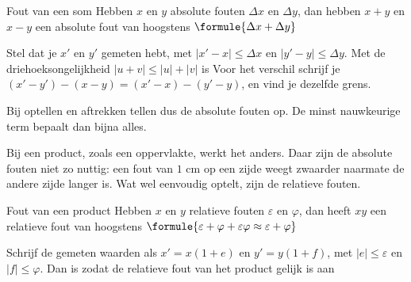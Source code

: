 \begin{theorie}
\begin{stelling}{Fout van een som}
Hebben $x$ en $y$ absolute fouten $\Delta x$ en $\Delta y$, dan hebben $x + y$ en $x - y$ een absolute fout van hoogstens \qquad $\formule{\Delta x + \Delta y}$
\end{stelling}

\begin{bewijs}
Stel dat je $x'$ en $y'$ gemeten hebt, met $|x' - x| \leqslant \Delta x$ en $|y' - y| \leqslant \Delta y$. Met de driehoeksongelijkheid $|u + v| \leqslant |u| + |v|$ is
Voor het verschil schrijf je $(x' - y') - (x - y) = (x' - x) - (y' - y)$, en vind je dezelfde grens.
\end{bewijs}
\end{theorie}

Bij optellen en aftrekken tellen dus de absolute fouten op. De minst nauwkeurige term bepaalt dan bijna alles.


Bij een product, zoals een oppervlakte, werkt het anders. Daar zijn de absolute fouten niet zo nuttig: een fout van $1$ cm op een zijde weegt zwaarder naarmate de andere zijde langer is. Wat wel eenvoudig optelt, zijn de relatieve fouten.

\begin{theorie}
\begin{stelling}{Fout van een product}
Hebben $x$ en $y$ relatieve fouten $\varepsilon$ en $\varphi$, dan heeft $xy$ een relatieve fout van hoogstens \qquad $\formule{\varepsilon + \varphi + \varepsilon\varphi \approx \varepsilon + \varphi}$
\end{stelling}

\begin{bewijs}
Schrijf de gemeten waarden als $x' = x(1 + e)$ en $y' = y(1 + f)$, met $|e| \leqslant \varepsilon$ en $|f| \leqslant \varphi$. Dan is
zodat de relatieve fout van het product gelijk is aan
\end{bewijs}
\end{theorie}

